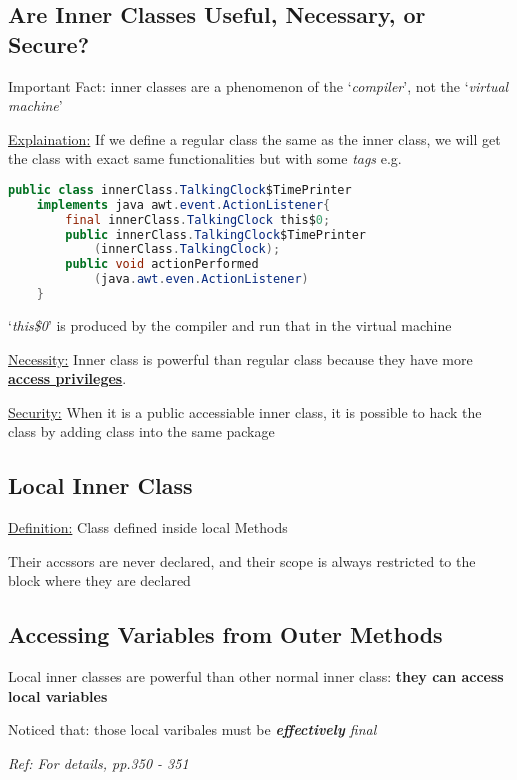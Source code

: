 \documentclass[12pt]{article}
\begin{document}
\subsection{Are Inner Classes Useful, Necessary, or Secure?}
Important Fact: inner classes are a phenomenon of the `\emph{compiler}', not the `\emph{virtual machine}'

\underline{Explaination:} If we define a regular class the same as the inner class, 
we will get the class with exact same functionalities but with some \emph{tags}\newline
e.g.
\begin{lstlisting}[language=Java]
public class innerClass.TalkingClock$TimePrinter
    implements java awt.event.ActionListener{
        final innerClass.TalkingClock this$0;
        public innerClass.TalkingClock$TimePrinter
            (innerClass.TalkingClock);
        public void actionPerformed
            (java.awt.even.ActionListener)
    }
\end{lstlisting}
`\emph{this\$0}' is produced by the compiler and run that in the virtual machine

\underline{Necessity:}\newline
Inner class is powerful than regular class because they have more \underline{\textbf{access privileges}}.

\underline{Security:}\newline
When it is a public accessiable inner class, it is possible to hack the class by adding class into the same package

\subsection{Local Inner Class}
\underline{Definition:} Class defined inside local Methods

Their accssors are never declared, and their scope is always restricted to the block where they are declared

\subsection{Accessing Variables from Outer Methods}
Local inner classes are powerful than other normal inner class: \textbf{they can access local variables}

Noticed that: those local varibales must be \emph{\textbf{effectively} final}

\emph{Ref: For details, pp.350 - 351}
\end{document}
